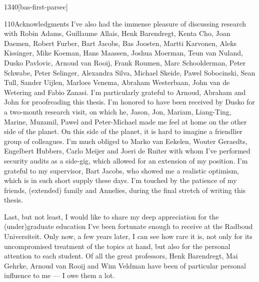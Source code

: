 \begin{parsec}{1340}[bas-first-parsec]
\begin{point}{110}{Acknowledgments}
I've also had the immense pleasure of discussing research with
    Robin Adams,
    Guillaume Allais,
    Henk Barendregt,
    Kenta Cho,
    Joan Daemen,
    Robert Furber,
    Bart Jacobs,
    Bas Joosten,
    Martti Karvonen,
    Aleks Kissinger,
    Mike Koeman,
    Hans Maassen,
    Joshua Moerman,
    Teun van Nuland,
    Dusko Pavlovic,
    Arnoud van Rooij,
    Frank Roumen,
    Marc Schoolderman,
    Peter Schwabe,
    Peter Selinger,
    Alexandra Silva,
    Michael Skeide,
    Pawel Sobocinski,
    Sean Tull,
    Sander Uijlen,
    Marloes Venema,
    Abraham Westerbaan,
    John van de Wetering and
    Fabio Zanasi.
I'm particularly grateful to Arnoud, Abraham and John
    for proofreading this thesis.
I'm honored to have been received by Dusko
    for a two-month research visit,
    on which he, Jason, Jon, Mariam, Liang-Ting, Marine, Muzamil, Pawel
    and Peter-Michael made me feel at home on the other side of the planet.
On this side of the planet,
    it is hard to imagine a friendlier group of colleagues.
I'm much obliged to Marko van Eekelen,
    Wouter Geraedts,
    Engelbert Hubbers,
    Carlo Meijer and
    Joeri de Ruiter
    with whom I've performed security audits as a side-gig,
    which allowed for an extension of my position.
I'm grateful to my supervisor, Bart Jacobs,
    who showed me a realistic optimism,
    which is in such short supply these days.
I'm touched by the patience of my friends, (extended) family and Annelies,
    during the final stretch of writing this thesis.

Last, but not least, I would like to share my deep appreciation
    for the (under)graduate education
    I've been fortunate enough to receive at the Radboud Universiteit.
Only now, a few years later,
    I can see how rare it is,
    not only for its uncompromised treatment of the topics at hand,
    but also for the personal attention to each student.
Of all the great professors,
Henk Barendregt,
    Mai Gehrke, Arnoud van Rooij and Wim Veldman
    have been of particular personal influence to me --- I owe them a lot.
\end{point}
\end{parsec}


